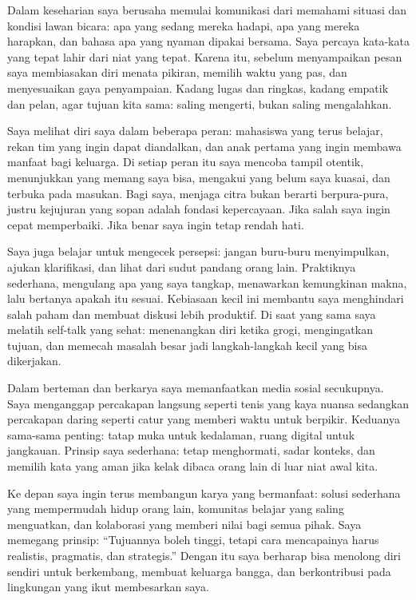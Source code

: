 \documentclass[
  letterpaper,
  DIV=11,
  numbers=noendperiod]{scrreprt}
\begin{document}
Dalam keseharian saya berusaha memulai komunikasi dari memahami situasi
dan kondisi lawan bicara: apa yang sedang mereka hadapi, apa yang mereka
harapkan, dan bahasa apa yang nyaman dipakai bersama. Saya percaya
kata-kata yang tepat lahir dari niat yang tepat. Karena itu, sebelum
menyampaikan pesan saya membiasakan diri menata pikiran, memilih waktu
yang pas, dan menyesuaikan gaya penyampaian. Kadang lugas dan ringkas,
kadang empatik dan pelan, agar tujuan kita sama: saling mengerti, bukan
saling mengalahkan.

Saya melihat diri saya dalam beberapa peran: mahasiswa yang terus
belajar, rekan tim yang ingin dapat diandalkan, dan anak pertama yang
ingin membawa manfaat bagi keluarga. Di setiap peran itu saya mencoba
tampil otentik, menunjukkan yang memang saya bisa, mengakui yang belum
saya kuasai, dan terbuka pada masukan. Bagi saya, menjaga citra bukan
berarti berpura-pura, justru kejujuran yang sopan adalah fondasi
kepercayaan. Jika salah saya ingin cepat memperbaiki. Jika benar saya
ingin tetap rendah hati.

Saya juga belajar untuk mengecek persepsi: jangan buru-buru
menyimpulkan, ajukan klarifikasi, dan lihat dari sudut pandang orang
lain. Praktiknya sederhana, mengulang apa yang saya tangkap, menawarkan
kemungkinan makna, lalu bertanya apakah itu sesuai. Kebiasaan kecil ini
membantu saya menghindari salah paham dan membuat diskusi lebih
produktif. Di saat yang sama saya melatih self-talk yang sehat:
menenangkan diri ketika grogi, mengingatkan tujuan, dan memecah masalah
besar jadi langkah-langkah kecil yang bisa dikerjakan.

Dalam berteman dan berkarya saya memanfaatkan media sosial secukupnya.
Saya menganggap percakapan langsung seperti tenis yang kaya nuansa
sedangkan percakapan daring seperti catur yang memberi waktu untuk
berpikir. Keduanya sama-sama penting: tatap muka untuk kedalaman, ruang
digital untuk jangkauan. Prinsip saya sederhana: tetap menghormati,
sadar konteks, dan memilih kata yang aman jika kelak dibaca orang lain
di luar niat awal kita.

Ke depan saya ingin terus membangun karya yang bermanfaat: solusi
sederhana yang mempermudah hidup orang lain, komunitas belajar yang
saling menguatkan, dan kolaborasi yang memberi nilai bagi semua pihak.
Saya memegang prinsip: ``Tujuannya boleh tinggi, tetapi cara mencapainya
harus realistis, pragmatis, dan strategis.'' Dengan itu saya berharap
bisa menolong diri sendiri untuk berkembang, membuat keluarga bangga,
dan berkontribusi pada lingkungan yang ikut membesarkan saya.
\end{document}
